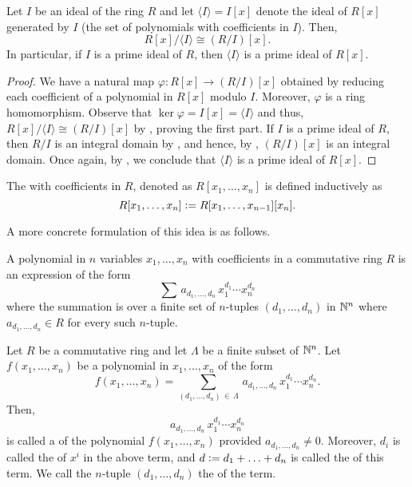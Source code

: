 \begin{prop} \label{prop:prime-ideals-maintained}
    Let $I$ be an ideal of the ring $R$ and let $\langle I \rangle = I[x]$ denote the ideal of $R[x]$ generated by $I$ (the set of polynomials with coefficients in $I$). Then, 
    \[
        R[x] / \langle I \rangle \cong (R/I)[x].
    \]
    In particular, if $I$ is a prime ideal of $R$, then $\langle I \rangle$ is a prime ideal of $R[x]$.
\end{prop}
\begin{proof}
    We have a natural map $\varphi \colon R[x] \to (R/I)[x]$ obtained by reducing each coefficient of a polynomial in $R[x]$ modulo $I$. Moreover, $\varphi$ is a ring homomorphism. Observe that $\ker\varphi = I[x] = \langle I \rangle$ and thus, $R[x]/\langle I \rangle \cong (R/I)[x]$ by , proving the first part. If $I$ is a prime ideal of $R$, then $R/I$ is an integral domain by , and hence, by , $(R/I)[x]$ is an integral domain. Once again, by , we conclude that $\langle I \rangle$ is a prime ideal of $R[x]$.
\end{proof}

\begin{defn}
    The  with coefficients in $R$, denoted as $R[x_1, \ldots, x_n]$ is defined inductively as 
    \[
        R[x_1, \ldots, x_n] \vcentcolon= R[x_1, \ldots, x_{n-1}][x_n].
    \]
\end{defn}

A more concrete formulation of this idea is as follows. 

\begin{defn}
   A polynomial in $n$ variables $x_1, \ldots, x_n$ with coefficients in a commutative ring $R$ is an expression of the form
   \[
        \sum \, a_{d_1, \ldots, d_n} \, x_1^{d_1} \cdots x_n^{d_n}
   \]   
   where the summation is over a finite set of $n$-tuples $(d_1, \ldots, d_n)$ in $\mathbb{N}^n$ where $a_{d_1, \ldots, d_n} \in R$ for every such $n$-tuple.
\end{defn}

\begin{defn}
   Let $R$ be a commutative ring and let $\Lambda$ be a finite subset of $\mathbb{N}^n$. Let $f(x_1, \ldots, x_n)$ be a polynomial in $x_1, \ldots, x_n$ of the form
   \[
        f(x_1, \ldots, x_n) = \sum_{(d_1,\ldots,d_n)\,\in\, \Lambda} \, a_{d_1, \ldots, d_n} \, x_1^{d_1} \cdots x_n^{d_n}.
   \]
   Then, 
   \[
        a_{d_1,\ldots,d_n} \, x_1^{d_1} \cdots x_n^{d_n}
   \]
   is called a  of the polynomial $f(x_1, \ldots,x_n)$ provided $a_{d_1,\ldots,d_n} \neq 0$. Moreover, $d_i$ is called the  of $x^i$ in the above term, and $d \vcentcolon= d_1+\ldots+d_n$ is called the  of this term. We call the $n$-tuple $(d_1, \ldots, d_n)$ the  of the term.
\end{defn}

